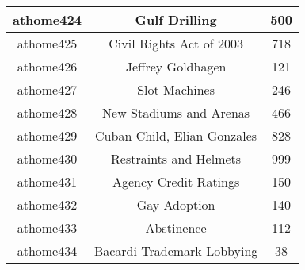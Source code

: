 \begin{table}[h]
\begin{tabular}{|c|c|c|}
athome424 & Gulf Drilling                     & 500 \\ \hline
athome425 & Civil Rights Act of 2003          & 718 \\ \hline
athome426 & Jeffrey Goldhagen                 & 121 \\ \hline
athome427 & Slot Machines                     & 246 \\ \hline
athome428 & New Stadiums and Arenas           & 466 \\ \hline
athome429 & Cuban Child, Elian Gonzales       & 828 \\ \hline
athome430 & Restraints and Helmets            & 999 \\ \hline
athome431 & Agency Credit Ratings             & 150 \\ \hline
athome432 & Gay Adoption                      & 140 \\ \hline
athome433 & Abstinence                        & 112 \\ \hline
athome434 & Bacardi Trademark Lobbying        & 38 \\ \hline
\end{tabular}
\end{table}

